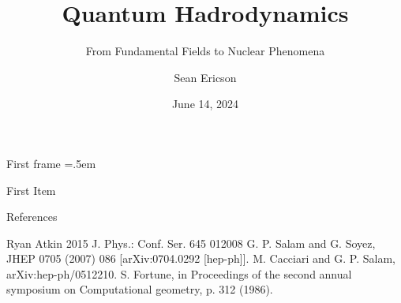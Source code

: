 \documentclass[xcolor={dvipsnames}]{beamer}
\title{Quantum Hadrodynamics}
\subtitle{From Fundamental Fields to Nuclear Phenomena}
\author{Sean Ericson}
\institute{UO\\PHYS 663}
\date{June 14, 2024}
\let\olditemize=\itemize
\let\endolditemize=\enditemize
\renewenvironment{itemize}{\olditemize \itemsep=.5em }{\endolditemize}
\begin{document}
\frame{\titlepage}

\begin{frame}{First frame}
\begin{itemize}
    \item<1-> First Item
\end{itemize}
\end{frame}

\begin{frame}{References}
\begin{thebibliography}{5}
     Ryan Atkin 2015 J. Phys.: Conf. Ser. 645 012008
     G. P. Salam and G. Soyez, JHEP 0705 (2007) 086 [arXiv:0704.0292 [hep-ph]].
     M. Cacciari and G. P. Salam, arXiv:hep-ph/0512210.
     S. Fortune, in Proceedings of the second annual symposium on Computational geometry, p. 312 (1986).
\end{thebibliography}
\end{frame}
\end{document}
